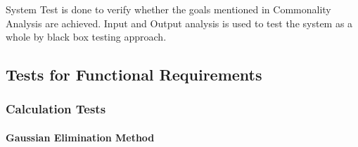 \documentclass[12pt, titlepage]{article}
\begin{document}
System Test is done to verify whether the goals mentioned in Commonality
Analysis are achieved. Input and Output analysis is used to test the system as a
whole by black box testing approach.
	
\subsection{Tests for Functional Requirements}

\subsubsection{Calculation Tests}
		
\paragraph{Gaussian Elimination Method }
\end{document}
